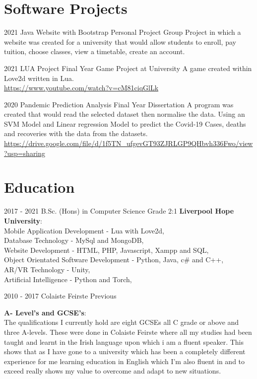 \documentclass[]{friggeri-cv}
\begin{document}
\section{Software Projects}
\begin{entrylist}
  \entry
  {2021}
  {Java Website with Bootstrap}
  {Personal Project}
  {Group Project in which a website was created for a university that would allow
  students to enroll, pay tuition, choose classes, view a timetable, create an account.}

  \entry
  {2021}
  {LUA Project}
  {Final Year Game Project at University}
  {A game created within Love2d written in Lua.
  \\ \url{https://www.youtube.com/watch?v=cM81ciqGlLk}}
  
  \entry
  {2020}
  {Pandemic Prediction Analysis }
  {Final Year Dissertation}
  {A program was created that would read the selected dataset then normalise the data. Using an SVM Model and Linear regression Model to predict the Covid-19 Cases, deaths and recoveries with the data from the datasets. 
  \\ \url{https://drive.google.com/file/d/1f5TN_ufgevGT93ZJRLGP9QHbvh336Fwo/view?usp=sharing}}
\end{entrylist}
\pagebreak
\section{Education}
\begin{entrylist}
  \entry
    {2017 - 2021}
    {B.Sc. (Hons) in Computer Science}
    {Grade 2:1}
    {\textbf{Liverpool Hope University}:\\ 
    Mobile Application Development - Lua with Love2d,\\
    Database Technology - MySql and MongoDB,\\
    Website Development - HTML, PHP, Javascript, Xampp and SQL,\\
    Object Orientated Software Development - Python, Java, c\# and C++,\\
    AR/VR Technology - Unity,\\
    Artificial Intelligence  - Python and Torch,\\}

  \entry
    {2010 - 2017}
    {Colaiste Feirste}
    {Previous}
    {\textbf{A- Level's and GCSE's}: \\ 
    The qualifications I currently hold are eight GCSEs all C grade or above and three A-levels. These were done in Colaiste Feirste where all my studies had been taught and learnt in the Irish language upon which i am a fluent speaker. This shows that as I have gone to a university which has been a completely different experience for me learning education in English which I'm also fluent in and to exceed really shows my value to overcome and adapt to new situations.

    }
    
\end{entrylist}
\end{document}

